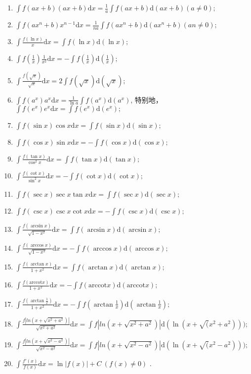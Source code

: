 \begin{enumerate}
    \item $ \int f(ax+b)(ax+b)\mathrm{d}x = \frac{1}{a}\int f(ax+b)\mathrm{d}(ax+b) (a\neq 0) ; $
    \item $ \int f(ax^n+b)x^{n-1}\mathrm{d}x = \frac{1}{na}\int f(ax^n+b)\mathrm{d}(ax^n + b) (an\neq0) ; $
    \item $ \int \frac{f(\ln x)}{x}\mathrm{d}x = \int f(\ln x)\mathrm{d}(\ln x); $
    \item $ \int f(\frac{1}{x})\frac{1}{x^2}\mathrm{d}x = -\int f(\frac{1}{x})\mathrm{d}(\frac{1}{x}) ; $
    \item $ \int \frac{f(\sqrt x)}{\sqrt x} \mathrm{d}x = 2 \int f(\sqrt x)\mathrm{d}(\sqrt x) ; $
    \item $ \int f(a^x)a^x\mathrm{d}x = \frac{1}{\ln a}\int f(a^x)\mathrm{d}(a^x) $,
    特别地，$ \int f(e^x)e^x\mathrm{d}x = \int f(e^x)\mathrm{d}(e^x) ; $
    \item $ \int f(\sin x)\cos x \mathrm{d}x = \int f(\sin x)\mathrm{d}(\sin x) ; $
    \item $ \int f(\cos x)\sin x \mathrm{d}x = -\int f(\cos x)\mathrm{d}(\cos x); $
    \item $ \int \frac{f(\tan x)}{\cos^2 x}\mathrm{d}x = \int f(\tan x)\mathrm{d}(\tan x) ; $
    \item $ \int \frac{f(\cot x)}{\sin^2 x}\mathrm{d}x = -\int f(\cot x)\mathrm{d}(\cot x) ; $
    \item $ \int f(\sec x)\sec x \tan x \mathrm{d}x = \int f(\sec x)\mathrm{d}(\sec x) ; $
    \item $ \int f(\csc x)\csc x \cot x\mathrm{d}x = -\int f(\csc x)\mathrm{d}(\csc x) ; $
    \item $ \int \frac{f(\arcsin x)}{\sqrt{1-x^2}}\mathrm{d}x = \int f(\arcsin x)\mathrm{d}(\arcsin x) ; $
    \item $ \int \frac{f(\arccos x)}{\sqrt{1-x^2}}\mathrm{d}x = -\int f(\arccos x)\mathrm{d}(\arccos x) ; $
    \item $ \int \frac{f(\arctan x)}{1+x^2}\mathrm{d}x = \int f(\arctan x)\mathrm{d}(\arctan x) ; $
    \item $ \int \frac{f(\textrm{arccot} x)}{1+x^2}\mathrm{d}x = -\int f(\textrm{arccot} x)\mathrm{d}(\textrm{arccot} x) ; $
    \item $ \int \frac{f(\arctan \frac{1}{x})}{1+x^2}\mathrm{d}x = -\int f(\arctan \frac{1}{x})\mathrm{d}(\arctan \frac{1}{x}) ; $
    \item $ \int \frac{f|ln(x+\sqrt{x^2+a^2})|}{\sqrt{x^2+a^2}}\mathrm{d}x = 
    \int f|ln(x+\sqrt{x^2+a^2})|\mathrm{d}(\ln(x+\sqrt(x^2+a^2))) ; $
    \item $ \int \frac{f|ln(x+\sqrt{x^2-a^2})|}{\sqrt{x^2-a^2}}\mathrm{d}x = 
    \int f|ln(x+\sqrt{x^2-a^2})|\mathrm{d}(\ln(x+\sqrt(x^2-a^2))) ; $
    \item $ \int \frac{f'(x)}{f(x)}\mathrm{d}x = \ln|f(x)|+C\ (f(x)\neq0) $ .
\end{enumerate}

